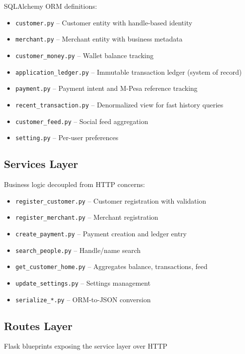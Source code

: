 \documentclass[12pt, a4paper, twoside, openright]{report}
\begin{document}
SQLAlchemy ORM definitions:
\begin{itemize}
    \item \texttt{customer.py} -- Customer entity with handle-based identity
    \item \texttt{merchant.py} -- Merchant entity with business metadata
    \item \texttt{customer\_money.py} -- Wallet balance tracking
    \item \texttt{application\_ledger.py} -- Immutable transaction ledger (system of record)
    \item \texttt{payment.py} -- Payment intent and M-Pesa reference tracking
    \item \texttt{recent\_transaction.py} -- Denormalized view for fast history queries
    \item \texttt{customer\_feed.py} -- Social feed aggregation
    \item \texttt{setting.py} -- Per-user preferences
\end{itemize}

\subsection{Services Layer}

Business logic decoupled from HTTP concerns:
\begin{itemize}
    \item \texttt{register\_customer.py} -- Customer registration with validation
    \item \texttt{register\_merchant.py} -- Merchant registration
    \item \texttt{create\_payment.py} -- Payment creation and ledger entry
    \item \texttt{search\_people.py} -- Handle/name search
    \item \texttt{get\_customer\_home.py} -- Aggregates balance, transactions, feed
    \item \texttt{update\_settings.py} -- Settings management
    \item \texttt{serialize\_*.py} -- ORM-to-JSON conversion
\end{itemize}

\subsection{Routes Layer}

Flask blueprints exposing the service layer over HTTP
\end{document}
